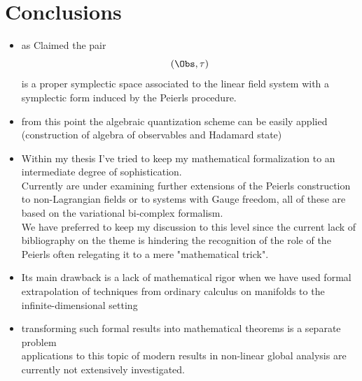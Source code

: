 \documentclass[a4paper,11pt]{scrartcl}
\begin{document}
    \section{Conclusions}
    \begin{itemize}
        \item as Claimed the pair $$(\Obs, \tau)$$ is a proper symplectic space associated to the linear field system with a symplectic form induced by the Peierls procedure.
        \item from this point the algebraic quantization scheme can be easily applied (construction of algebra of observables and Hadamard state)
        \item    Within my thesis I've tried to keep my mathematical formalization to an intermediate degree of sophistication.\\
        Currently are under examining further extensions of the Peierls construction to non-Lagrangian fields or to systems with Gauge freedom, all of these are based on the variational bi-complex formalism. \\
    We have preferred to keep my discussion to this level since the current lack of bibliography on the theme is hindering the recognition of the role of the Peierls often relegating it to a mere "mathematical trick".
        \item Its main drawback is a lack of mathematical rigor when we have used formal extrapolation of techniques from ordinary calculus on manifolds to the infinite-dimensional setting
        \item transforming such formal results into mathematical theorems is a separate problem\\
        applications to this topic of modern results in non-linear global analysis are currently not extensively investigated.
    \end{itemize}

    
\end{document}
